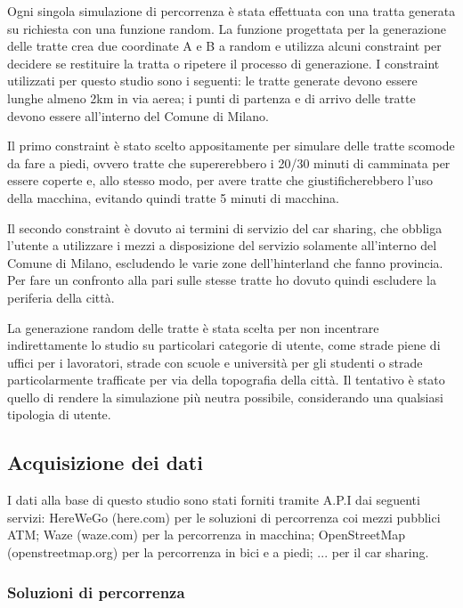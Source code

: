 Ogni singola simulazione di percorrenza è stata effettuata con una tratta generata su richiesta con una funzione random. La funzione progettata per la generazione delle tratte crea due coordinate A e B a random e utilizza alcuni constraint per decidere se restituire la tratta o ripetere il processo di generazione. I constraint utilizzati per questo studio sono i seguenti: le tratte generate devono essere lunghe almeno 2km in via aerea; i punti di partenza e di arrivo delle tratte devono essere all'interno del Comune di Milano.

Il primo constraint è stato scelto appositamente per simulare delle tratte scomode da fare a piedi, ovvero tratte che supererebbero i 20/30 minuti di camminata per essere coperte e, allo stesso modo, per avere tratte che giustificherebbero l'uso della macchina, evitando quindi tratte 5 minuti di macchina.

Il secondo constraint è dovuto ai termini di servizio del car sharing, che obbliga l'utente a utilizzare i mezzi a disposizione del servizio solamente all'interno del Comune di Milano, escludendo le varie zone dell'hinterland che fanno provincia. Per fare un confronto alla pari sulle stesse tratte ho dovuto quindi escludere la periferia della città.

La generazione random delle tratte è stata scelta per non incentrare indirettamente lo studio su particolari categorie di utente, come strade piene di uffici per i lavoratori, strade con scuole e università per gli studenti o strade particolarmente trafficate per via della topografia della città. Il tentativo è stato quello di rendere la simulazione più neutra possibile, considerando una qualsiasi tipologia di utente.


\subsection{Acquisizione dei dati}

I dati alla base di questo studio sono stati forniti tramite A.P.I dai seguenti servizi: HereWeGo (here.com) per le soluzioni di percorrenza coi mezzi pubblici ATM; Waze (waze.com) per la percorrenza in macchina; OpenStreetMap (openstreetmap.org) per la percorrenza in bici e a piedi; ... per il car sharing.

\subsubsection{Soluzioni di percorrenza}

